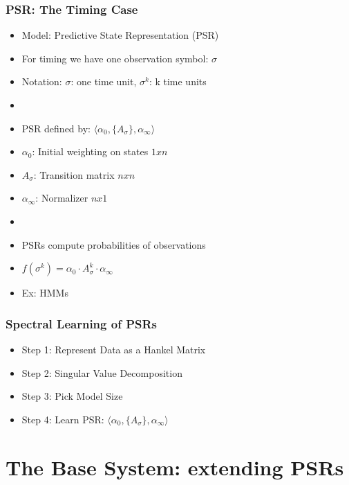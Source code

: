 \documentclass{beamer}
\begin{document}
\begin{frame}
\frametitle{PSR: The Timing Case}

\begin{itemize}
\item Model: Predictive State Representation (PSR)
\item[] For timing we have one observation symbol: {$\sigma$}
\item[] Notation: $\sigma$: one time unit, $\sigma^k$: k time units
\item[]
\item PSR defined by: $\langle \alpha_0, \{A_\sigma\},\alpha_\infty \rangle$
\item[] $\alpha_0$: Initial weighting on states $1xn$
\item[] $A_\sigma$: Transition matrix $nxn$
\item[] $\alpha_\infty$: Normalizer $nx1$
\item[]
\item PSRs compute probabilities of observations

\item[] $f(\sigma^k) = \alpha_0 \cdot A_\sigma^k \cdot \alpha_\infty$
\item[] Ex: HMMs
\end{itemize}

\end{frame}


\begin{frame}
\frametitle{Spectral Learning of PSRs}

\begin{itemize}
\item[] Step 1: Represent Data as a Hankel Matrix
\item[] Step 2: Singular Value Decomposition
\item[] Step 3: Pick Model Size
\item[] Step 4: Learn PSR: $\langle \alpha_0, \{A_\sigma\},\alpha_\infty \rangle$ 
\end{itemize}

\end{frame}

\section{The Base System: extending PSRs}
\end{document}
